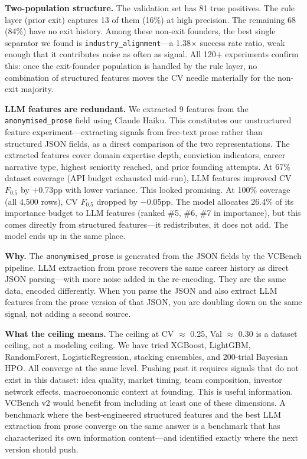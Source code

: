 \documentclass[10pt, conference]{IEEEtran}
\begin{document}
\textbf{Two-population structure.} The validation set has 81 true positives. The rule layer (prior exit) captures 13 of them (16\%) at high precision. The remaining 68 (84\%) have no exit history. Among these non-exit founders, the best single separator we found is \texttt{industry\_alignment}---a 1.38$\times$ success rate ratio, weak enough that it contributes noise as often as signal. All 120+ experiments confirm this: once the exit-founder population is handled by the rule layer, no combination of structured features moves the CV needle materially for the non-exit majority.

\textbf{LLM features are redundant.} We extracted 9 features from the \texttt{anonymised\_prose} field using Claude Haiku. This constitutes our unstructured feature experiment---extracting signals from free-text prose rather than structured JSON fields, as a direct comparison of the two representations. The extracted features cover domain expertise depth, conviction indicators, career narrative type, highest seniority reached, and prior founding attempts. At 67\% dataset coverage (API budget exhausted mid-run), LLM features improved CV $F_{0.5}$ by +0.73pp with lower variance. This looked promising. At 100\% coverage (all 4,500 rows), CV $F_{0.5}$ dropped by $-$0.05pp. The model allocates 26.4\% of its importance budget to LLM features (ranked \#5, \#6, \#7 in importance), but this comes directly from structured features---it redistributes, it does not add. The model ends up in the same place.

\textbf{Why.} The \texttt{anonymised\_prose} is generated from the JSON fields by the VCBench pipeline. LLM extraction from prose recovers the same career history as direct JSON parsing---with more noise added in the re-encoding. They are the same data, encoded differently. When you parse the JSON and also extract LLM features from the prose version of that JSON, you are doubling down on the same signal, not adding a second source.

\textbf{What the ceiling means.} The ceiling at CV $\approx$ 0.25, Val $\approx$ 0.30 is a dataset ceiling, not a modeling ceiling. We have tried XGBoost, LightGBM, RandomForest, LogisticRegression, stacking ensembles, and 200-trial Bayesian HPO. All converge at the same level. Pushing past it requires signals that do not exist in this dataset: idea quality, market timing, team composition, investor network effects, macroeconomic context at founding. This is useful information. VCBench v2 would benefit from including at least one of these dimensions. A benchmark where the best-engineered structured features and the best LLM extraction from prose converge on the same answer is a benchmark that has characterized its own information content---and identified exactly where the next version should push.
\end{document}
